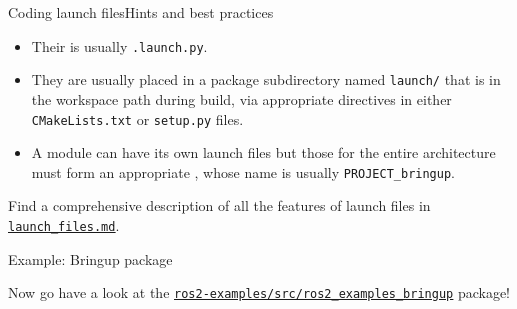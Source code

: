 \begin{frame}{Coding launch files}{Hints and best practices}
	\begin{itemize}
		\item Their  is usually \texttt{.launch.py}.
		\item They are usually placed in a package subdirectory named \texttt{launch/} that is  in the workspace path during build, via appropriate directives in either \texttt{CMakeLists.txt} or \texttt{setup.py} files.
		\item A module can have its own launch files but those for the entire architecture must form an appropriate , whose name is usually \texttt{PROJECT\_bringup}.
	\end{itemize}
	\begin{block}{}
		\centering
		Find a comprehensive description of all the features of launch files in \href{https://github.com/IntelligentSystemsLabUTV/ros2-examples/blob/humble/launch_files.md}{\color{blue}\underline{\texttt{launch\_files.md}}}.
	\end{block}
\end{frame}

\begin{frame}{Example: Bringup package}
  \begin{block}{}
    \centering
	  Now go have a look at the \href{https://github.com/IntelligentSystemsLabUTV/ros2-examples/tree/humble/src/ros2_examples_bringup}{\color{blue}\underline{\texttt{ros2-examples/src/ros2\_examples\_bringup}}} package!
  \end{block}
\end{frame}

